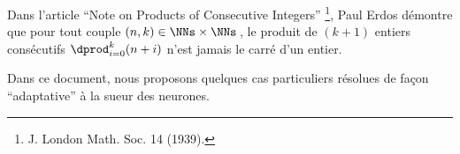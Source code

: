 Dans l'article \enquote{Note on Products of Consecutive Integers}
\footnote{
	J. London Math. Soc. 14 (1939).
},
Paul Erdos démontre que pour tout couple $(n, k) \in \NNs \times \NNs$\,, le produit de $(k+1)$ entiers consécutifs $\dprod_{i = 0}^{k} (n + i)$ n'est jamais le carré d'un entier. 

\medskip

Dans ce document, nous proposons quelques cas particuliers résolues de façon \enquote{adaptative} à la sueur des neurones.

